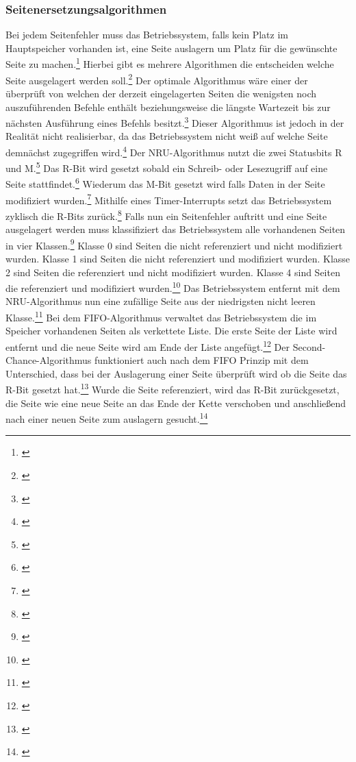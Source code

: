 \subsubsection{Seitenersetzungsalgorithmen}
Bei jedem Seitenfehler muss das Betriebssystem, falls kein Platz im Hauptspeicher vorhanden ist, eine Seite auslagern um Platz für die gewünschte Seite zu machen.\footnote{\cite[S.~267]{Tanenbaum.2016}} Hierbei gibt es mehrere Algorithmen die entscheiden welche Seite ausgelagert werden soll.\footnote{\cite[S.~267]{Tanenbaum.2016}} Der optimale Algorithmus wäre einer der überprüft von welchen der derzeit eingelagerten Seiten die wenigsten noch auszuführenden Befehle enthält beziehungsweise die längste Wartezeit bis zur nächsten Ausführung eines Befehls besitzt.\footnote{\cite[S.~268]{Tanenbaum.2016}}  Dieser Algorithmus ist jedoch in der Realität nicht realisierbar, da das Betriebssystem nicht weiß auf welche Seite demnächst zugegriffen wird.\footnote{\cite[S.~268]{Tanenbaum.2016}}
Der \ac{NRU}-Algorithmus nutzt die zwei Statusbits R und M.\footnote{\cite[S.~269]{Tanenbaum.2016}} Das R-Bit wird gesetzt sobald ein Schreib- oder Lesezugriff auf eine Seite stattfindet.\footnote{\cite[S.~269]{Tanenbaum.2016}}  Wiederum das M-Bit gesetzt wird falls Daten in der Seite modifiziert wurden.\footnote{\cite[S.~269]{Tanenbaum.2016}} Mithilfe eines Timer-Interrupts setzt das Betriebssystem zyklisch die R-Bits zurück.\footnote{\cite[S.~269]{Tanenbaum.2016}} Falls nun ein Seitenfehler auftritt und eine Seite ausgelagert werden muss klassifiziert das Betriebssystem alle vorhandenen Seiten in vier Klassen.\footnote{\cite[S.~270]{Tanenbaum.2016}}  Klasse 0 sind Seiten die nicht referenziert und nicht modifiziert wurden. Klasse 1 sind Seiten die nicht referenziert und modifiziert wurden. Klasse 2 sind Seiten die referenziert und nicht modifiziert wurden. Klasse 4 sind Seiten die referenziert und modifiziert wurden.\footnote{\cite[S.~270]{Tanenbaum.2016}} Das Betriebssystem entfernt mit dem \ac{NRU}-Algorithmus nun eine zufällige Seite aus der niedrigsten nicht leeren Klasse.\footnote{\cite[S.~270]{Tanenbaum.2016}}
Bei dem \ac{FIFO}-Algorithmus verwaltet das Betriebssystem die im Speicher vorhandenen Seiten als verkettete Liste. Die erste Seite der Liste wird entfernt und die neue Seite wird am Ende der Liste angefügt.\footnote{\cite[S.~270]{Tanenbaum.2016}}
Der Second-Chance-Algorithmus funktioniert auch nach dem \ac{FIFO} Prinzip mit dem Unterschied, dass bei der Auslagerung einer Seite überprüft wird ob die Seite das R-Bit gesetzt hat.\footnote{\cite[S.~271]{Tanenbaum.2016}} Wurde die Seite referenziert, wird das R-Bit zurückgesetzt, die Seite wie eine neue Seite an das Ende der Kette verschoben und anschließend nach einer neuen Seite zum auslagern gesucht.\footnote{\cite[S.~271]{Tanenbaum.2016}}
